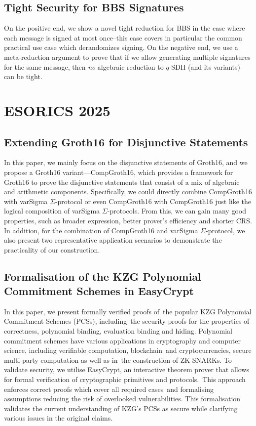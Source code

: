\documentclass[11pt,oneside]{book}
\theoremstyle{definition}
\theoremstyle{remark}
\theoremstyle{plain}
\begin{document}
\section{\cite{cryptoeprint:2025/1973} Tight Security for BBS Signatures}
On the positive end, we show a novel tight reduction for BBS in the case where each message is signed at most once--this case covers in particular the common practical use case which derandomizes signing. On the negative end, we use a meta-reduction argument to prove that if we allow generating multiple signatures for the same message, then {\em no} algebraic reduction to $q$-SDH (and its variants) can be tight.



\chapter{ESORICS 2025}
\section{\cite{10.1007/978-3-032-07891-9_26} Extending Groth16 for Disjunctive Statements}
In this paper, we mainly focus on the disjunctive statements of Groth16, and we propose a Groth16 variant---CompGroth16, which provides a framework for Groth16 to prove the disjunctive statements that consist of a mix of algebraic and arithmetic components. Specifically, we could directly combine CompGroth16 with varSigma $\Sigma$-protocol or even CompGroth16 with CompGroth16 just like the logical composition of varSigma $\Sigma$-protocols. From this, we can gain many good properties, such as broader expression, better prover's efficiency and shorter CRS. In addition, for the combination of CompGroth16 and varSigma $\Sigma$-protocol, we also present two representative application scenarios to demonstrate the practicality of our construction.

\section{\cite{10.1007/978-3-032-07891-9_16,cryptoeprint:2025/1972} Formalisation of the KZG Polynomial Commitment Schemes in EasyCrypt}
In this paper, we present formally verified proofs of the popular KZG Polynomial Commitment Schemes (PCSs), including the security proofs for the properties of correctness, polynomial binding, evaluation binding and hiding. Polynomial commitment schemes have various applications in cryptography and computer science, including verifiable computation, blockchain and cryptocurrencies, secure multi-party computation as well as in the construction of ZK-SNARKs. To validate security, we utilise EasyCrypt, an interactive theorem prover that allows for formal verification of cryptographic primitives and protocols. This approach enforces correct proofs which cover all required cases and formalising assumptions reducing the risk of overlooked vulnerabilities. This formalisation validates the current understanding of KZG's PCSs as secure while clarifying various issues in the original claims.
\end{document}
